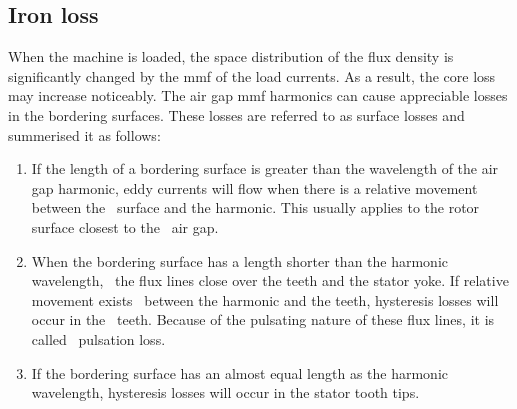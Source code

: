 \subsection{Iron loss}\label{subsec:iron_loss}
When the machine is loaded, the space distribution of the flux density is significantly changed by the mmf of the load currents. As a result, the core loss may increase noticeably. The air gap mmf harmonics can cause appreciable losses in the bordering surfaces. These losses are referred to as surface losses and \cite{Vogt1996} summerised it as follows:
\begin{enumerate}
  \item If the length of a bordering surface is greater than the wavelength of the air~%
  gap harmonic, eddy currents will flow when there is a relative movement between the~%
  surface and the harmonic. This usually applies to the rotor surface closest to the~%
  air gap.
  \item When the bordering surface has a length shorter than the harmonic wavelength,~%
  the flux lines close over the teeth and the stator yoke. If relative movement exists~%
  between the harmonic and the teeth, hysteresis losses will occur in the~%
  teeth. Because of the pulsating nature of these flux lines, it is called~%
  pulsation loss.
  \item If the bordering surface has an almost equal length as the harmonic~%
  wavelength, hysteresis losses will occur in the stator tooth tips. 
\end{enumerate}

